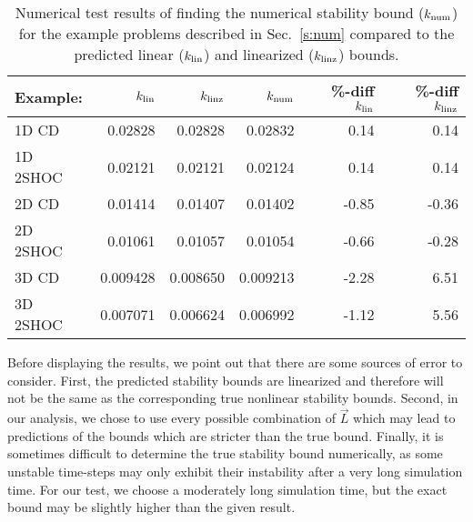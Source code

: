 \documentclass{article}
\begin{document}
\begin{table}[p]
\begin{center}
\begin{tabular}{|l|r|r|r|r|r|} \hline
Example: & $k_{\mbox{\scriptsize lin}}$ & $k_{\mbox{\scriptsize linz}}$ & $k_{\mbox{\scriptsize num}}$ & \%-diff $k_{\mbox{\scriptsize lin}}$ & \%-diff $k_{\mbox{\scriptsize linz}}$ \\
\hline
1D CD    & 0.02828  & 0.02828  & 0.02832  &  0.14 &  0.14 \\
1D 2SHOC & 0.02121  & 0.02121  & 0.02124  &  0.14 &  0.14 \\
2D CD    & 0.01414  & 0.01407  & 0.01402  & -0.85 & -0.36 \\
2D 2SHOC & 0.01061  & 0.01057  & 0.01054  & -0.66 & -0.28 \\
3D CD    & 0.009428 & 0.008650 & 0.009213 & -2.28 &  6.51 \\
3D 2SHOC & 0.007071 & 0.006624 & 0.006992 & -1.12 &  5.56 \\
\hline
\end{tabular}
\caption{Numerical test results of finding the numerical stability bound ($k_{\mbox{\scriptsize num}}$) for the example problems described in Sec.~\ref{s:num} compared to the predicted linear ($k_{\mbox{\scriptsize lin}}$) and linearized ($k_{\mbox{\scriptsize linz}}$) bounds.\label{t:results}}
\end{center}
\end{table}


Before displaying the results, we point out that there are some sources of error to consider.  First, the predicted stability bounds are linearized and therefore will not be the same as the corresponding true nonlinear stability bounds.  Second, in our analysis, we chose to use every possible combination of $\vec L$ which may lead to predictions of the bounds which are stricter than the true bound.  Finally, it is sometimes difficult to determine the true stability bound numerically, as some unstable time-steps may only exhibit their instability after a very long simulation time.  For our test, we choose a moderately long simulation time, but the exact bound may be slightly higher than the given result. 
\end{document}
